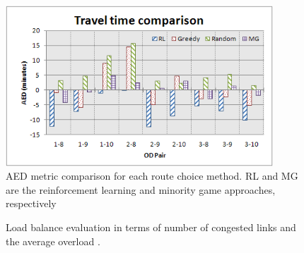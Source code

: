 \documentclass{RITA}
\begin{document}
\begin{figure}[ht]
    \centerline{\includegraphics[width=10cm]{img/travelTimeComparison-hatched.png}}
    \caption{AED metric comparison for each route choice method. RL and MG are the reinforcement learning and minority game approaches, respectively}
    \label{fig:travelTimeComparison}
\end{figure}

\begin{figure}[H]
  \centering
  \caption{Load balance evaluation in terms of number of congested links  and the average overload .}
  \label{fig:loadBalance}
\end{figure}
\end{document}

